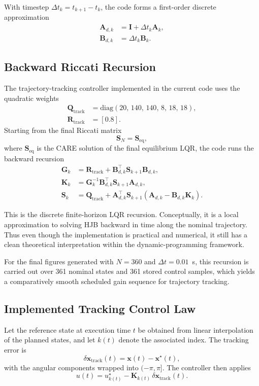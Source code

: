 \documentclass[conference]{IEEEtran}
\begin{document}
With timestep $\Delta t_k = t_{k+1}-t_k$, the code forms a first-order discrete approximation
\begin{align}
\bm{A}_{d,k} &= \bm{I} + \Delta t_k \bm{A}_k, \\
\bm{B}_{d,k} &= \Delta t_k \bm{B}_k.
\end{align}

\subsection{Backward Riccati Recursion}
The trajectory-tracking controller implemented in the current code uses the quadratic weights
\begin{align}
\bm{Q}_{\mathrm{track}} &= \mathrm{diag}(20,\,140,\,140,\,8,\,18,\,18), \\
\bm{R}_{\mathrm{track}} &= [0.8].
\end{align}
Starting from the final Riccati matrix
\begin{equation}
\bm{S}_N = \bm{S}_{\mathrm{eq}},
\end{equation}
where $\bm{S}_{\mathrm{eq}}$ is the CARE solution of the final equilibrium LQR, the code runs the backward recursion
\begin{align}
\bm{G}_k &=
\bm{R}_{\mathrm{track}} + \bm{B}_{d,k}^{\top}\bm{S}_{k+1}\bm{B}_{d,k},
\\
\bm{K}_k &=
\bm{G}_k^{-1}\bm{B}_{d,k}^{\top}\bm{S}_{k+1}\bm{A}_{d,k},
\label{eq:tvlqr_gain}
\\
\bm{S}_k &=
\bm{Q}_{\mathrm{track}}
+
\bm{A}_{d,k}^{\top}\bm{S}_{k+1}(\bm{A}_{d,k}-\bm{B}_{d,k}\bm{K}_k).
\label{eq:tvlqr_riccati}
\end{align}

This is the discrete finite-horizon LQR recursion. Conceptually, it is a local approximation to solving HJB backward in time along the nominal trajectory. Thus even though the implementation is practical and numerical, it still has a clean theoretical interpretation within the dynamic-programming framework.

For the final figures generated with $N=360$ and $\Delta t=0.01$~s, this recursion is carried out over 361 nominal states and 361 stored control samples, which yields a comparatively smooth scheduled gain sequence for trajectory tracking.

\subsection{Implemented Tracking Control Law}
Let the reference state at execution time $t$ be obtained from linear interpolation of the planned states, and let $k(t)$ denote the associated index. The tracking error is
\begin{equation}
\delta\bm{x}_{\mathrm{track}}(t)
=
\bm{x}(t)-\bm{x}^{\star}(t),
\end{equation}
with the angular components wrapped into $(-\pi,\pi]$. The controller then applies
\begin{equation}
u(t)=u_{k(t)}^{\star} - \bm{K}_{k(t)}\,\delta\bm{x}_{\mathrm{track}}(t).
\label{eq:tracking_control_law}
\end{equation}
\end{document}
